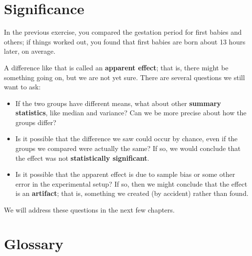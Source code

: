 \documentclass[12pt]{book}
\begin{document}
\section{Significance}

In the previous exercise, you compared the gestation period for first
babies and others; if things worked out, you found that first
babies are born about 13 hours later, on average.

A difference like that is called an {\bf apparent effect}; that is,
there might be something going on, but we are not yet sure.  There are
several questions we still want to ask:

\begin{itemize}

\item If the two groups have different means, what about other {\bf
  summary statistics}, like median and variance?  Can we be more
  precise about how the groups differ?

\item Is it possible that the difference we saw could occur by chance,
  even if the groups we compared were actually the same?  If so,
  we would conclude that the effect was not {\bf statistically
    significant}.

\item Is it possible that the apparent effect is due to sample bias or
  some other error in the experimental setup?  If so, then we might
  conclude that the effect is an {\bf artifact}; that is, something we
  created (by accident) rather than found. 

\end{itemize}

We will address these questions in the next few chapters.

\section{Glossary}
\end{document}

